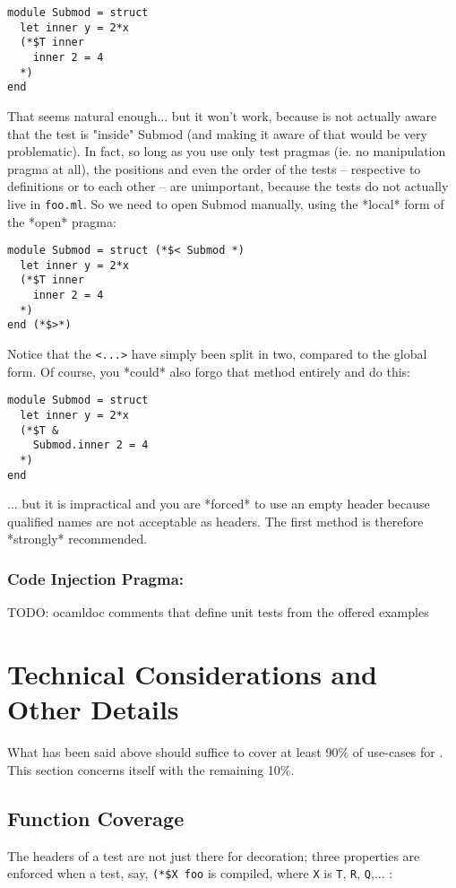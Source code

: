 \documentclass[a4paper,12pt]{article}
\begin{document}
\begin{itemize}
\begin{verbatim}
module Submod = struct
  let inner y = 2*x
  (*$T inner
    inner 2 = 4
  *)
end
\end{verbatim} 
That seems natural enough... but it won't work, because \qtest{} is not actually aware that
the test is "inside" Submod (and making it aware of that would be very problematic). In
fact, so long as you use only test pragmas (ie. no manipulation pragma at all), the
positions and even the order of the tests -- respective to definitions or to each other --
are unimportant, because the tests do not actually live in \texttt{foo.ml}. So we need to open
Submod manually, using the *local* form of the *open* pragma:
\begin{verbatim}
module Submod = struct (*$< Submod *)
  let inner y = 2*x
  (*$T inner
    inner 2 = 4
  *)
end (*$>*)
\end{verbatim} 
Notice that the \texttt{<...>} have simply been split in two, compared to the global form. Of
course, you *could* also forgo that method entirely and do this:
\begin{verbatim}
module Submod = struct
  let inner y = 2*x
  (*$T &
    Submod.inner 2 = 4
  *)
end
\end{verbatim} 
... but it is impractical and you are *forced* to use an empty header because qualified
names are not acceptable as headers. The first method is therefore *strongly* recommended.
\end{itemize}


\subsubsection{Code Injection Pragma: }



TODO: ocamldoc comments that define unit tests from the offered examples

\section{Technical Considerations and Other Details}

What has been said above should suffice to cover at least 90\% of use-cases for \qtest{}.
This section concerns itself with the remaining 10\%.

\subsection{Function Coverage}

The headers of a test are not just there for decoration; three properties are enforced
when a test, say, \texttt{(*\$X foo} is compiled, where \texttt{X} is
\texttt{T}, \texttt{R}, \texttt{Q},... :
\end{document}
